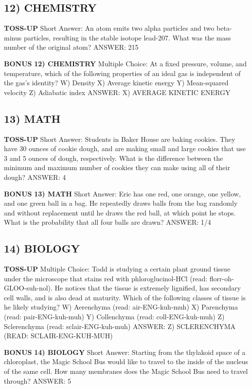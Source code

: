 \documentclass{article}
\begin{document}
\subsection*{12) CHEMISTRY}
\textbf{TOSS-UP}
Short Answer: An atom emits two alpha particles and two beta-minus particles, resulting in the stable isotope lead-207. What was the mass number of the original atom?
ANSWER: 215

\textbf{BONUS}
\textbf{12) CHEMISTRY}
Multiple Choice: At a fixed pressure, volume, and temperature, which of the following properties of an ideal gas is independent of the gas's identity?
W) Density
X) Average kinetic energy
Y) Mean-squared velocity
Z) Adiabatic index
ANSWER: X) AVERAGE KINETIC ENERGY

\subsection*{13) MATH}
\textbf{TOSS-UP}
Short Answer: Students in Baker House are baking cookies. They have 30 ounces of cookie dough, and are making small and large cookies that use 3 and 5 ounces of dough, respectively. What is the difference between the minimum and maximum number of cookies they can make using all of their dough?
ANSWER: 4

\textbf{BONUS}
\textbf{13) MATH}
Short Answer: Eric has one red, one orange, one yellow, and one green ball in a bag. He repeatedly draws balls from the bag randomly and without replacement until he draws the red ball, at which point he stops. What is the probability that all four balls are drawn?
ANSWER: 1/4

\subsection*{14) BIOLOGY}
\textbf{TOSS-UP}
Multiple Choice: Todd is studying a certain plant ground tissue under the microscope that stains red with phloroglucinol-HCl (read: florr-oh-GLOO-suh-nol). He notices that the tissue is extremely lignified, has secondary cell walls, and is also dead at maturity. Which of the following classes of tissue is he likely studying?
W) Aerenchyma (read: air-ENG-kuh-muh)
X) Parenchyma (read: pair-ENG-kuh-muh)
Y) Collenchyma (read: coll-ENG-kuh-muh)
Z) Sclerenchyma (read: sclair-ENG-kuh-muh)
ANSWER: Z) SCLERENCHYMA (READ: SCLAIR-ENG-KUH-MUH)

\textbf{BONUS}
\textbf{14) BIOLOGY}
Short Answer: Starting from the thylakoid space of a chloroplast, the Magic School Bus would like to travel to the inside of the nucleus of the same cell. How many membranes does the Magic School Bus need to travel through?
ANSWER: 5
\end{document}
